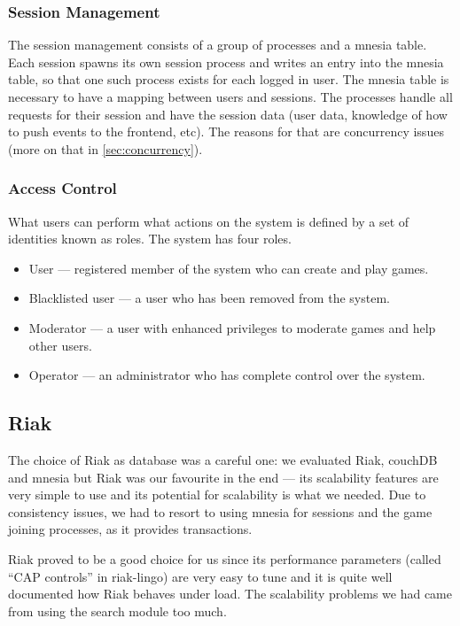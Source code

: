 \documentclass[11pt,a4paper]{report}
\begin{document}
\subsubsection{Session Management}
The session management consists of a group of processes and a mnesia table.
Each session spawns its own session process and writes an entry into the mnesia
table, so that one such process exists for each logged in user.
The mnesia table is necessary to have a mapping between users and sessions.
The processes handle all requests for their session and have the session data
(user data, knowledge of how to push events to the frontend, etc).
The reasons for that are concurrency issues
(more on that in \ref{sec:concurrency}).


\subsubsection{Access Control}
What users can perform what actions on the system is defined by a set of
identities known as roles. The system has four roles.

\begin{itemize}
\item User --- registered member of the system who can create and play games.
\item Blacklisted user --- a user who has been removed from the system.
\item Moderator --- a user with enhanced privileges to moderate games and help
other users.
\item Operator --- an administrator who has complete control over the system.

\end{itemize}


\subsection{Riak}
\label{sec:riak}
The choice of Riak as database was a careful one: we evaluated Riak, couchDB
and mnesia but Riak was our favourite in the end --- its scalability features
are very simple to use and its potential for scalability is what we needed.
Due to consistency issues, we had to resort to using mnesia for sessions and
the game joining processes, as it provides transactions.

Riak proved to be a good choice for us since its performance parameters (called
``CAP controls''\cite{cap_controls} in riak-lingo) are very easy to tune and it
is quite well documented how Riak behaves under load. The scalability problems
we had came from using the search module too much.
\end{document}
